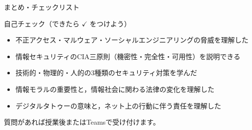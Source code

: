 \documentclass[aspectratio=43,professionalfonts,handout,10pt]{beamer}
\begin{document}
\begin{frame}{まとめ・チェックリスト}
  \begin{block}{自己チェック（できたら $\checkmark$ をつけよう）}
    \begin{itemize}
      \item[$\square$] 不正アクセス・マルウェア・ソーシャルエンジニアリングの脅威を理解した
      \item[$\square$] 情報セキュリティのCIA三原則（機密性・完全性・可用性）を説明できる
      \item[$\square$] 技術的・物理的・人的の3種類のセキュリティ対策を学んだ
      \item[$\square$] 情報モラルの重要性と，情報社会に関わる法律の変化を理解した
      \item[$\square$] デジタルタトゥーの意味と，ネット上の行動に伴う責任を理解した
    \end{itemize}
  \end{block}

  \vfill

  {\small 質問があれば授業後またはTeamsで受け付けます。}
\end{frame}
\end{document}
